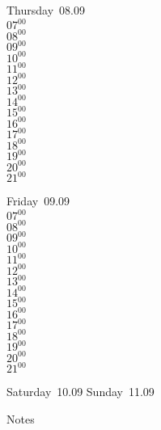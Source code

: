 \documentclass[11pt,a4paper]{book}\usepackage[]{graphicx}\usepackage[]{color}
\begin{document}
\clearpage
\begin{headerbox}
\end{headerbox}
\begin{weekdaybox}
  Thursday~08.09\\
  { 
  \vfill
  $07^{00}$\\
$08^{00}$\\
$09^{00}$\\
$10^{00}$\\
$11^{00}$\\
$12^{00}$\\
$13^{00}$\\
$14^{00}$\\
$15^{00}$\\
$16^{00}$\\
$17^{00}$\\
$18^{00}$\\
$19^{00}$\\
$20^{00}$\\
$21^{00}$\\
  }
\end{weekdaybox} 
\begin{weekdaybox}
  Friday~09.09\\
  { 
  \vfill
  $07^{00}$\\
$08^{00}$\\
$09^{00}$\\
$10^{00}$\\
$11^{00}$\\
$12^{00}$\\
$13^{00}$\\
$14^{00}$\\
$15^{00}$\\
$16^{00}$\\
$17^{00}$\\
$18^{00}$\\
$19^{00}$\\
$20^{00}$\\
$21^{00}$\\
  }
\end{weekdaybox}
\begin{weekendbox}
  Saturday~10.09
  \tcblower
  Sunday~11.09
\end{weekendbox} %
\begin{notebox}
  Notes
\end{notebox}
\clearpage
\end{document}
